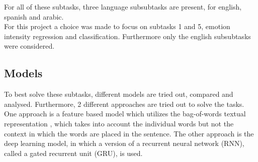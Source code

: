 For all of these subtasks, three language subsubtasks are present, for english, spanish and arabic.\\ 
For this project a choice was made to focus on subtasks 1 and 5, emotion intensity regression and classification. Furthermore only the  english subsubtasks were considered.
\subsection{Models}
To best solve these subtasks, different models are tried out, compared and analysed. Furthermore, 2 different approaches are tried out to solve the tasks. One approach is a feature based model which utilizes the bag-of-words textual representation \cite{speech}, which takes into account the individual words but not the context in which the words are placed in the sentence. The other approach is the deep learning model, in which a version of a recurrent neural network (RNN), called a gated recurrent unit (GRU), is used.

